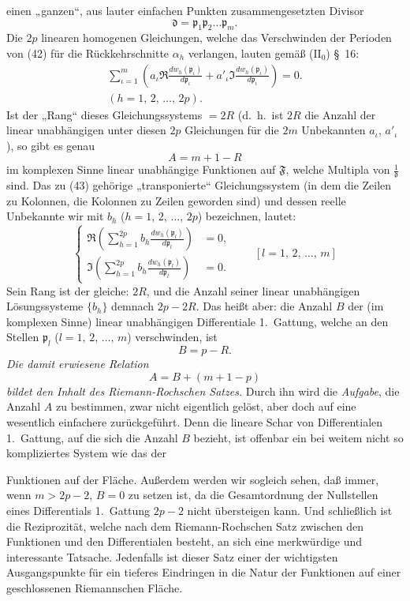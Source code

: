 \documentclass{article}
\begin{document}
einen „ganzen“, aus lauter einfachen Punkten zusammengesetzten Divisor
\[ \mathfrak{d} = \mathfrak{p}_1 \mathfrak{p}_2 \dots \mathfrak{p}_m. \]
Die $2p$ linearen homogenen Gleichungen, welche das Verschwinden der Perioden von (42) für die Rückkehrschnitte $\alpha_h$ verlangen, lauten gemäß ($\mathrm{II}_0$) §~16:
\[ \begin{gathered}
\sum_{\iota=1}^m \left( a_\iota \Re \frac{dw_h(\mathfrak{p}_\iota)}{d\mathfrak{p}_\iota} + a'_\iota \Im \frac{dw_h(\mathfrak{p}_\iota)}{d\mathfrak{p}_\iota} \right) = 0. \\
(h = 1, \, 2, \, \dots, \, 2p).
\end{gathered} \tag{43} \]
Ist der „Rang“ dieses Gleichungssystems $= 2R$ (d.\ h.\ ist $2R$ die Anzahl der linear unabhängigen unter diesen $2p$ Gleichungen für die $2m$ Unbekannten $a_\iota$, $a'_\iota$), so gibt es genau
\[ A = m + 1 - R \]
im komplexen Sinne linear unabhängige Funktionen auf $\mathfrak{F}$, welche Multipla von $\frac{1}{\mathfrak{d}}$ sind. Das zu (43) gehörige „transponierte“ Gleichungssystem (in dem die Zeilen zu Kolonnen, die Kolonnen zu Zeilen geworden sind) und dessen reelle Unbekannte wir mit $b_h$ ($h = 1, \, 2, \, \dots, \, 2p$) bezeichnen, lautet:
\[ \left\{ \begin{aligned}
\Re \left( \sum_{h=1}^{2p} b_h \frac{dw_h(\mathfrak{p}_l)}{d\mathfrak{p}_l} \right) &= 0, \\
\Im \left( \sum_{h=1}^{2p} b_h \frac{dw_h(\mathfrak{p}_l)}{d\mathfrak{p}_l} \right) &= 0.
\end{aligned} \right. \qquad [l = 1, \, 2, \, \dots, \, m] \]
Sein Rang ist der gleiche: $2R$, und die Anzahl seiner linear unabhängigen Lösungssysteme $\{b_h\}$ demnach $2p - 2R$. Das heißt aber: die Anzahl $B$ der (im komplexen Sinne) linear unabhängigen Differentiale 1.\ Gattung, welche an den Stellen $\mathfrak{p}_l$ ($l = 1, \, 2, \, \dots, \, m$) verschwinden, ist
\[ B = p - R. \]
\emph{Die damit erwiesene Relation}
\[ A = B + (m + 1 - p) \]
\emph{bildet den Inhalt des Riemann-Rochschen Satzes.} Durch ihn wird die \emph{Aufgabe}, die Anzahl $A$ zu bestimmen, zwar nicht eigentlich gelöst, aber doch auf eine wesentlich einfachere zurückgeführt. Denn die lineare Schar von Differentialen 1.\ Gattung, auf die sich die Anzahl $B$ bezieht, ist offenbar ein bei weitem nicht so kompliziertes System wie das der

Funktionen auf der Fläche. Außerdem werden wir sogleich sehen, daß immer, wenn $m > 2p - 2$, $B = 0$ zu setzen ist, da die Gesamtordnung der Nullstellen eines Differentials 1.\ Gattung $2p - 2$ nicht übersteigen kann. Und schließlich ist die Reziprozität, welche nach dem Riemann-Rochschen Satz zwischen den Funktionen und den Differentialen besteht, an sich eine merkwürdige und interessante Tatsache. Jedenfalls ist dieser Satz einer der wichtigsten Ausgangspunkte für ein tieferes Eindringen in die Natur der Funktionen auf einer geschlossenen Riemannschen Fläche.
\end{document}
